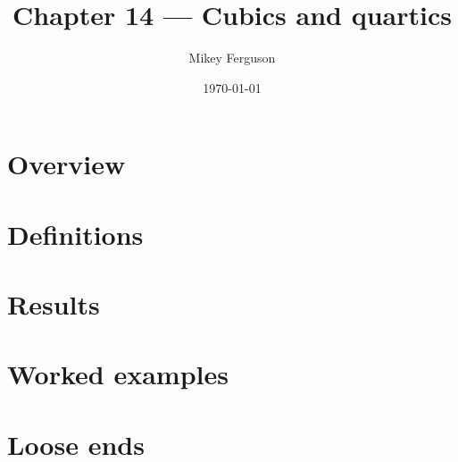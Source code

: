 \documentclass[11pt]{article}
\title{Chapter 14 --- Cubics and quartics}
\author{Mikey Ferguson}
\date{\today}
\begin{document}
\maketitle
\tableofcontents
\bigskip

\section{Overview}

\section{Definitions}

\section{Results}

\section{Worked examples}

\section{Loose ends}
\end{document}
